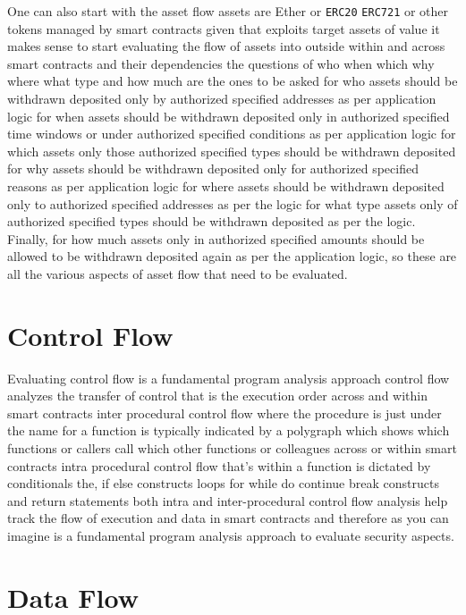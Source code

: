 One can also start with the asset flow assets are Ether or \verb|ERC20| \verb|ERC721| or other tokens managed by smart contracts given that exploits target assets of value it makes sense to start evaluating the flow of assets into outside within and across smart contracts and their dependencies the questions of who when which why where what type and how much are the ones to be asked for who assets should be withdrawn deposited only by authorized specified addresses as per application logic for when assets should be withdrawn deposited only in authorized specified time windows or under authorized specified conditions as per application logic for which assets only those authorized specified types should be withdrawn deposited for why assets should be withdrawn deposited only for authorized specified reasons as per application logic for where assets should be withdrawn deposited only to authorized specified addresses as per the logic for what type assets only of authorized specified types should be withdrawn deposited as per the logic. Finally, for how much assets only in authorized specified amounts should be allowed to be withdrawn deposited again as per the application logic, so these are all the various aspects of asset flow that need to be evaluated.

\section{Control Flow}

Evaluating control flow is a fundamental program analysis approach control flow analyzes the transfer of control that is the execution order across and within smart contracts inter procedural control flow where the procedure is just under the name for a function is typically indicated by a polygraph which shows which functions or callers call which other functions or colleagues across or within smart contracts intra procedural control flow that's within a function is dictated by conditionals the, if else constructs loops for while do continue break constructs and return statements both intra and inter-procedural control flow analysis help track the flow of execution and data in smart contracts and therefore as you can imagine is a fundamental program analysis approach to evaluate security aspects.

\section{Data Flow}

